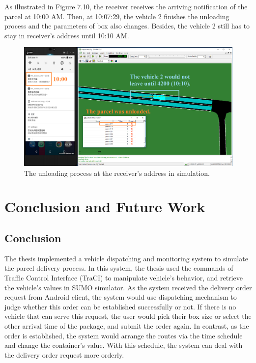 \documentclass[12pt]{ksthesis}
\begin{document}
\begin{thesis}
{\begin{figure}[H]
\label{Fig:Receiver_request}
\end{figure}

As illustrated in Figure 7.10, the receiver receives the arriving notification of the parcel at 10:00 AM. Then, at 10:07:29, the vehicle 2 finishes the unloading process and the parameters of box also changes. Besides, the vehicle 2 still has to stay in receiver’s address until 10:10 AM.

\begin{figure}[H]
\centering
\includegraphics[width=1.12\textwidth]{./Thesis_figures/F7-10_unloadingProcess.PNG}
\caption{\large The unloading process at the receiver’s address in simulation.}
\vspace{0.5cm}
\label{Fig:unloading_request}
\end{figure}













\chapter{Conclusion and Future Work} \label{Chap:Conclusion}

\section{Conclusion}
The thesis implemented a vehicle dispatching and monitoring system to simulate the parcel delivery process. In this system, the thesis used the commands of Traffic Control Interface (TraCI) to manipulate vehicle’s behavior, and retrieve the vehicle’s values in SUMO simulator. As the system received the delivery order request from Android client, the system would use dispatching mechanism to judge whether this order can be established successfully or not. If there is no vehicle that can serve this request, the user would pick their box size or select the other arrival time of the package, and submit the order again. In contrast, as the order is established, the system would arrange the routes via the time schedule and change the container’s value. With this schedule, the system can deal with the delivery order request more orderly. 

}
\end{thesis}
\end{document}

